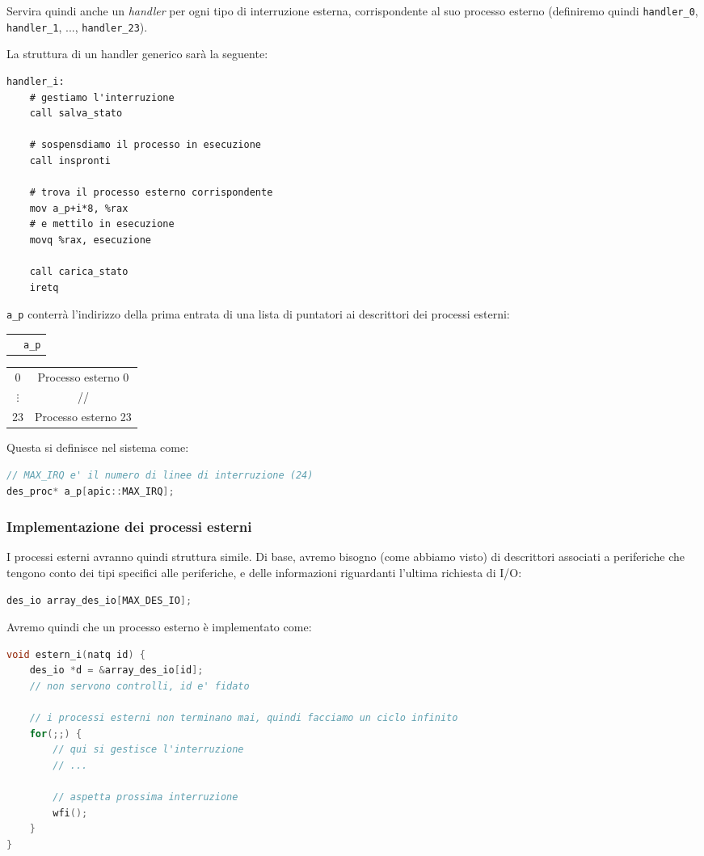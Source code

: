 \documentclass[a4paper,11pt]{article}
\begin{document}
Servira quindi anche un \textit{handler} per ogni tipo di interruzione esterna, corrispondente al suo processo esterno (definiremo quindi \lstinline|handler_0|, \lstinline|handler_1|, ..., \lstinline|handler_23|).

La struttura di un handler generico sarà la seguente:
\begin{lstlisting}	
handler_i:
	# gestiamo l'interruzione
	call salva_stato

	# sospensdiamo il processo in esecuzione
	call inspronti

	# trova il processo esterno corrispondente
	mov a_p+i*8, %rax
	# e mettilo in esecuzione
	movq %rax, esecuzione

	call carica_stato
	iretq
\end{lstlisting}

\lstinline|a_p| conterrà l'indirizzo della prima entrata di una lista di puntatori ai descrittori dei processi esterni:
\begin{center}
	\begin{tabular}{ p{.4cm} c }
& \lstinline|a_p|
\end{tabular}

\begin{tabular}{c |c|}
	0 & Processo esterno 0 \\ 
	$\vdots$ & // \\ 
	23 & Processo esterno 23
\end{tabular}
\end{center}

Questa si definisce nel sistema come:
\begin{lstlisting}[language=C++, style=codestyle]	
// MAX_IRQ e' il numero di linee di interruzione (24)
des_proc* a_p[apic::MAX_IRQ];
\end{lstlisting}

\subsubsection{Implementazione dei processi esterni}
I processi esterni avranno quindi struttura simile.
Di base, avremo bisogno (come abbiamo visto) di descrittori associati a periferiche che tengono conto dei tipi specifici alle periferiche, e delle informazioni riguardanti l'ultima richiesta di I/O:
\begin{lstlisting}[language=C++, style=codestyle]	
des_io array_des_io[MAX_DES_IO];
\end{lstlisting}

Avremo quindi che un processo esterno è implementato come:
\begin{lstlisting}[language=C++, style=codestyle]	
void estern_i(natq id) {
	des_io *d = &array_des_io[id];
	// non servono controlli, id e' fidato

	// i processi esterni non terminano mai, quindi facciamo un ciclo infinito
	for(;;) {
		// qui si gestisce l'interruzione
		// ...
		
		// aspetta prossima interruzione
		wfi();
	}
}
\end{lstlisting}
\end{document}
